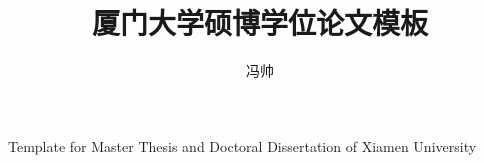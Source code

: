 \author{冯帅}
\title{厦门大学硕博学位论文模板}
{Template for Master Thesis and Doctoral Dissertation of Xiamen University}


